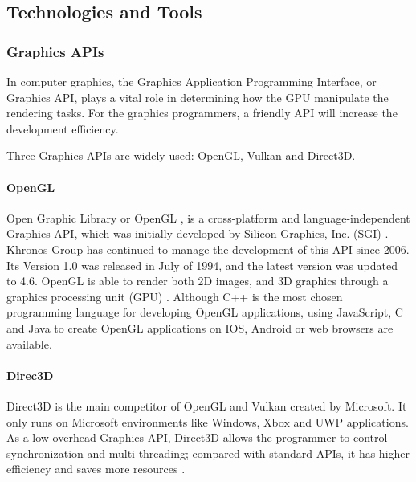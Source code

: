 \subsection{Technologies and Tools}
\label{br:tt}

\subsubsection{Graphics APIs}
\label{br:api}

In computer graphics, the Graphics Application Programming Interface, or Graphics API, plays a vital role in determining how the GPU manipulate the rendering tasks. For the graphics programmers, a friendly API will increase the development efficiency.

\hspace*{\fill}

Three Graphics APIs are widely used: OpenGL, Vulkan and Direct3D.

\paragraph{OpenGL}

Open Graphic Library or OpenGL \cite{OpenGLofficial}, is a cross-platform and language-independent Graphics API, which was initially developed by Silicon Graphics, Inc. (SGI) \cite{kessenich2016opengl}. Khronos Group has continued to manage the development of this API since 2006. Its Version 1.0 was released in July of 1994, and the latest version was updated to 4.6. OpenGL is able to render both 2D images, and 3D graphics through a graphics processing unit (GPU) \cite{kessenich2016opengl}. Although C++ is the most chosen programming language for developing OpenGL applications, using JavaScript, C and Java to create OpenGL applications on IOS, Android or web browsers are available.

\paragraph{Direc3D}

Direct3D \cite{d3dofficial} is the main competitor of OpenGL and Vulkan created by Microsoft. It only runs on Microsoft environments like Windows, Xbox and UWP applications. As a low-overhead Graphics API, Direct3D allows the programmer to control synchronization and multi-threading; compared with standard APIs, it has higher efficiency and saves more resources \cite{d3d10} \cite{blythe2006direct3d}.

